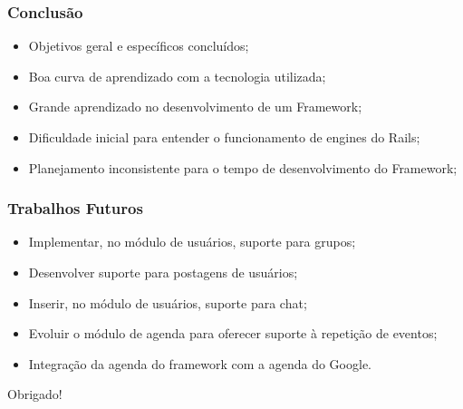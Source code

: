 \documentclass{beamer}
\begin{document}
\begin{frame}
\frametitle{Conclusão}

\begin{itemize}
	\item Objetivos geral e específicos concluídos;
	\item Boa curva de aprendizado com a tecnologia utilizada;
	\item Grande aprendizado no desenvolvimento de um Framework;
	\item Dificuldade inicial para entender o funcionamento de engines do Rails;
	\item Planejamento inconsistente para o tempo de desenvolvimento do Framework;
\end{itemize}

\end{frame}

\begin{frame}
\frametitle{Trabalhos Futuros}

\begin{itemize}
	\item Implementar, no módulo de usuários, suporte para grupos;
	\item Desenvolver suporte para postagens de usuários;
	\item Inserir, no módulo de usuários, suporte para chat;
	\item Evoluir o módulo de agenda para oferecer suporte à repetição de eventos;
	\item Integração da agenda do framework com a agenda do Google.
\end{itemize}

\end{frame}

\begin{frame}
\Huge{\centerline{Obrigado!}}
\end{frame}
\end{document}
